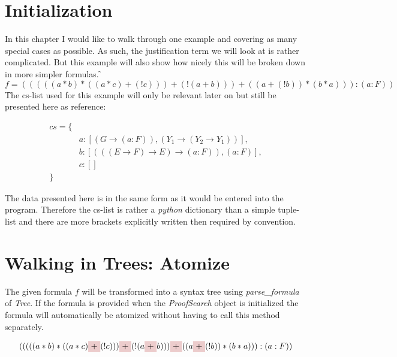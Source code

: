 \section{Initialization}
In this chapter I would like to walk through one example and covering as many special cases as possible. As such, the justification term we will look at is rather complicated. But this example will also show how nicely this will be broken down in more simpler formulas.
\newsavebox\f

\savebox\f{\vbox{\begin{equation}
f = (((((a*b)*((a*c)+(!c)))+(!(a+b)))+((a+(!b))*(b*a))):(a:F))	
\end{equation}}}
\usebox\f

The cs-list used for this example will only be relevant later on but still be presented here as reference:


\begin{equation}
\begin{split}
	cs = \{\\
	& a: [(G \rightarrow (a:F)), (Y_1 \rightarrow (Y_2 \rightarrow Y_1))],\\
	& b: [(((E \rightarrow F) \rightarrow E) \rightarrow (a:F)), (a:F)],\\
	& c: [] \\
	\}
\end{split}
\end{equation}

The data presented here is in the same form as it would be entered into the program. Therefore the cs-list is rather a \emph{python} dictionary than a simple tuple-list and there are more brackets explicitly written then required by convention.


\section{Walking in Trees: Atomize}

The given formula $f$ will be transformed into a syntax tree using \emph{parse\_formula} of \emph{Tree}. If the formula is provided when the \emph{ProofSearch} object is initialized the formula will automatically be atomized without having to call this method separately.

\begin{equation*}
	(((((a*b)*((a*c)
    \tikz[baseline]{\node[fill=red!20,anchor=base] (t1){$+$};} (!c)))
    \tikz[baseline]{\node[fill=red!20,anchor=base] (t2){$+$};} (!(a
    \tikz[baseline]{\node[fill=red!20,anchor=base] (t3){$+$};} b)))
    \tikz[baseline]{\node[fill=red!20,anchor=base] (t3){$+$};}((a
    \tikz[baseline]{\node[fill=red!20,anchor=base] (t3){$+$};}(!b))*(b*a))):(a:F))
\end{equation*}

